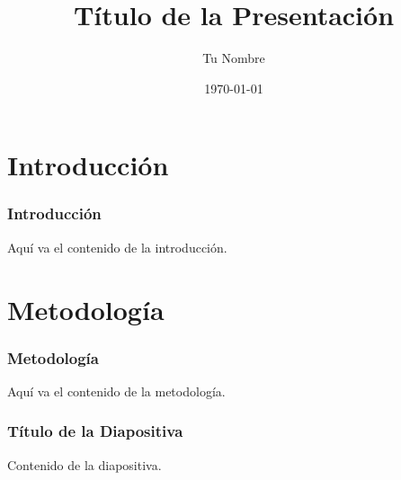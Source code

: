 \documentclass{beamer}
\title{Título de la Presentación}
\author{Tu Nombre}
\date{\today}
\begin{document}
\frame{\titlepage}

\section{Introducción}
\begin{frame}
    \frametitle{Introducción}
    Aquí va el contenido de la introducción.
\end{frame}

\section{Metodología}
\begin{frame}
    \frametitle{Metodología}
    Aquí va el contenido de la metodología.
\end{frame}

\begin{frame}
    \frametitle{Título de la Diapositiva}
    Contenido de la diapositiva.
\end{frame}
\end{document}
